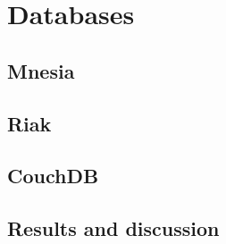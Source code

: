 \documentclass[11pt,a4paper]{report}
\begin{document}
\section{Databases}
\subsection{Mnesia}
\subsection{Riak}
\subsection{CouchDB}
\subsection{Results and discussion}



\end{document}
